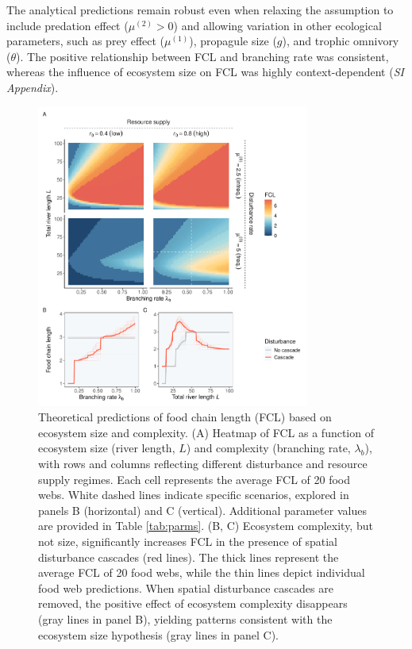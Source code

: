 \documentclass[11pt, class=article, crop=false]{standalone}
\begin{document}
The analytical predictions remain robust even when relaxing the assumption to include predation effect ($\mu^{(2)} > 0$) and allowing variation in other ecological parameters, such as prey effect ($\mu^{(1)}$), propagule size ($g$), and trophic omnivory ($\theta$).
The positive relationship between FCL and branching rate was consistent, whereas the influence of ecosystem size on FCL was highly context-dependent (\textit{SI Appendix}).

\begin{figure}
    \centering
    \includegraphics[width=0.8\textwidth]{data_fmt/fig_theo_main.pdf}
    \caption{Theoretical predictions of food chain length (FCL) based on ecosystem size and complexity. (A) Heatmap of FCL as a function of ecosystem size (river length, $L$) and complexity (branching rate, $\lambda_b$), with rows and columns reflecting different disturbance and resource supply regimes. Each cell represents the average FCL of 20 food webs. White dashed lines indicate specific scenarios, explored in panels B (horizontal) and C (vertical). Additional parameter values are provided in Table \ref{tab:parms}. (B, C) Ecosystem complexity, but not size, significantly increases FCL in the presence of spatial disturbance cascades (red lines). The thick lines represent the average FCL of 20 food webs, while the thin lines depict individual food web predictions. When spatial disturbance cascades are removed, the positive effect of ecosystem complexity disappears (gray lines in panel B), yielding patterns consistent with the ecosystem size hypothesis (gray lines in panel C).}
    \label{fig:sim-main}
\end{figure}
\end{document}
